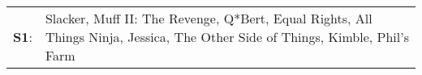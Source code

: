 \begin{supertabular}{p{0.03\textwidth}p{0.92\textwidth}}
 \textbf{S1}:  &  Slacker\textsuperscript{}, \enspace Muff II: The Revenge\textsuperscript{}, \enspace Q*Bert\textsuperscript{}, \enspace Equal Rights\textsuperscript{}, \enspace All Things Ninja\textsuperscript{}, \enspace Jessica\textsuperscript{}, \enspace The Other Side of Things\textsuperscript{}, \enspace Kimble\textsuperscript{}, \enspace Phil's Farm\textsuperscript{}  \enspace  \\
\end{supertabular}
